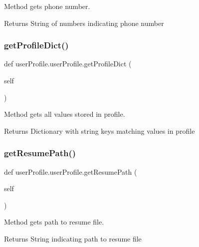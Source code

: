 Method gets phone number. 

\begin{DoxyReturn}{Returns}
String of numbers indicating phone number 
\end{DoxyReturn}
\mbox{\label{classuserProfile_1_1userProfile_adb914cd59899ee5fc36c23be7f2219d0}} 
\subsubsection{\texorpdfstring{get\+Profile\+Dict()}{getProfileDict()}}
{\footnotesize\ttfamily def user\+Profile.\+user\+Profile.\+get\+Profile\+Dict (\begin{DoxyParamCaption}\item[{}]{self }\end{DoxyParamCaption})}



Method gets all values stored in profile. 

\begin{DoxyReturn}{Returns}
Dictionary with string keys matching values in profile 
\end{DoxyReturn}
\mbox{\label{classuserProfile_1_1userProfile_aa89ac2871990f63c02a2bebb3393c979}} 
\subsubsection{\texorpdfstring{get\+Resume\+Path()}{getResumePath()}}
{\footnotesize\ttfamily def user\+Profile.\+user\+Profile.\+get\+Resume\+Path (\begin{DoxyParamCaption}\item[{}]{self }\end{DoxyParamCaption})}



Method gets path to resume file. 

\begin{DoxyReturn}{Returns}
String indicating path to resume file 
\end{DoxyReturn}
\mbox{\label{classuserProfile_1_1userProfile_afa86adbeac8ea685d8c9f1d343f734fd}} 
